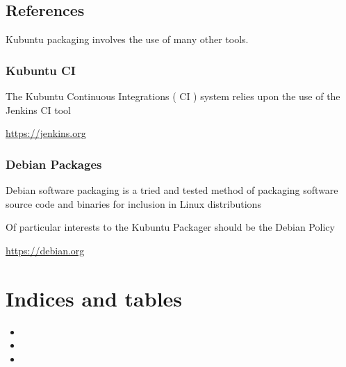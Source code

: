 \documentclass[letterpaper,10pt,english]{sphinxmanual}
\begin{document}
\section{References}
\label{\detokenize{docs/appendix/references:references}}\label{\detokenize{docs/appendix/references::doc}}
Kubuntu packaging involves the use of many other tools.


\subsection{Kubuntu CI}
\label{\detokenize{docs/appendix/references:kubuntu-ci}}
The Kubuntu Continuous Integrations ( CI ) system relies upon the use of the Jenkins CI tool

\url{https://jenkins.org}


\subsection{Debian Packages}
\label{\detokenize{docs/appendix/references:debian-packages}}
Debian software packaging is a tried and tested method of packaging software source code and binaries for inclusion in Linux distributions

Of particular interests to the Kubuntu Packager should be the Debian Policy

\url{https://debian.org}


\chapter{Indices and tables}
\label{\detokenize{index:indices-and-tables}}\begin{itemize}
\item {} 

\item {} 

\item {} 

\end{itemize}



\renewcommand{\indexname}{Index}
\printindex
\end{document}

